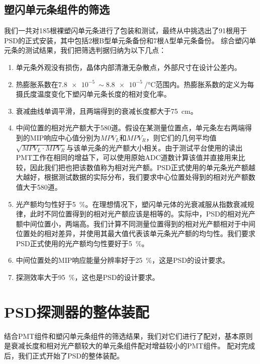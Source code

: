 \subsection{塑闪单元条组件的筛选}
\label{sec:construction:bar_selection}
我们一共对185根裸塑闪单元条进行了包装和测试，最终从中挑选出了91根用于PSD的正式安装，其中包括2根B型单元条备份和7根A型单元条备份。
综合塑闪单元条的测试结果，我们把筛选判据归纳为以下几点：
\begin{enumerate}
	\item 单元条外观没有损伤，晶体内部清澈无杂散点，外部尺寸在设计公差内。
	\item 热膨胀系数在$\SI{7.8e-5}{}\sim \SI{8.8e-5}{\per\celsius}$范围内。热膨胀系数的定义为每摄氏度温度变化下塑闪单元条长度的相对变化率。
	\item 衰减曲线单调平滑，且两端得到的衰减长度都大于\SI{75}{cm}。
	\item 中间位置的相对光产额大于580道。假设在某测量位置点，单元条左右两端得到的MIP响应中心值分别为$MPV_L$和$MPV_R$，则它们的几何平均值$\sqrt{MPV_L \cdot MPV_R}$与该单元条的光产额大小相关。由于测试平台使用的读出PMT工作在相同的增益下\cite{bar_test_2015}，可以使用原始ADC道数计算该值并直接用来比较，因此我们把也把该数值称为相对光产额。PSD正式使用的单元条光产额越大越好，根据测试数据的实际分布，我们要求中心位置处得到的相对光产额数值大于580道。
	\item 光产额均匀性好于\SI{5}{\percent}。在理想情况下，塑闪单元体的光衰减服从指数衰减规律，此时不同位置得到的相对光产额应该是相等的。实际中，PSD的相对光产额中间位置小，两端高。我们计算不同测量位置得到的相对光产额相对于中间位置处的相对差异，并使用其最大值代表该单元条光产额的均匀性。我们要求PSD正式使用的光产额均匀性要好于\SI{5}{\percent}。
	\item 中间位置处的MIP响应能量分辨率好于\SI{25}{\percent}，这是PSD的设计要求。
	\item 探测效率大于\SI{95}{\percent}，这也是PSD的设计要求。
\end{enumerate}

\section{PSD探测器的整体装配}
\label{sec:construction:psd_assembly}

结合PMT组件和塑闪单元条组件的筛选结果，我们对它们进行了配对，基本原则是衰减长度和相对光产额较大的单元条组件配对增益较小的PMT组件。
配对完成后，我们正式开始了PSD的整体装配。

